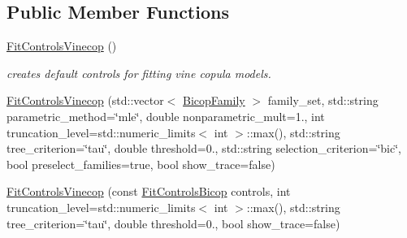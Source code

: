 \subsection*{Public Member Functions}
\begin{DoxyCompactItemize}
\item 
\hyperlink{classvinecopulib_1_1_fit_controls_vinecop_ad101d135c8d8fe66046d931947f45bef}{Fit\+Controls\+Vinecop} ()\hypertarget{classvinecopulib_1_1_fit_controls_vinecop_ad101d135c8d8fe66046d931947f45bef}{}\label{classvinecopulib_1_1_fit_controls_vinecop_ad101d135c8d8fe66046d931947f45bef}

\begin{DoxyCompactList}\small\item\em creates default controls for fitting vine copula models. \end{DoxyCompactList}\item 
\hyperlink{classvinecopulib_1_1_fit_controls_vinecop_af14e656b995fe29e69dc4c9c82efec61}{Fit\+Controls\+Vinecop} (std\+::vector$<$ \hyperlink{namespacevinecopulib_a42e95cc06d33896199caab0c11ad44f3}{Bicop\+Family} $>$ family\+\_\+set, std\+::string parametric\+\_\+method=\char`\"{}mle\char`\"{}, double nonparametric\+\_\+mult=1., int truncation\+\_\+level=std\+::numeric\+\_\+limits$<$ int $>$\+::max(), std\+::string tree\+\_\+criterion=\char`\"{}tau\char`\"{}, double threshold=0., std\+::string selection\+\_\+criterion=\char`\"{}bic\char`\"{}, bool preselect\+\_\+families=true, bool show\+\_\+trace=false)
\item 
\hyperlink{classvinecopulib_1_1_fit_controls_vinecop_a29d5e0ac531e57af617a2ff0953361e1}{Fit\+Controls\+Vinecop} (const \hyperlink{classvinecopulib_1_1_fit_controls_bicop}{Fit\+Controls\+Bicop} controls, int truncation\+\_\+level=std\+::numeric\+\_\+limits$<$ int $>$\+::max(), std\+::string tree\+\_\+criterion=\char`\"{}tau\char`\"{}, double threshold=0., bool show\+\_\+trace=false)
\end{DoxyCompactItemize}
{\bf }\par
